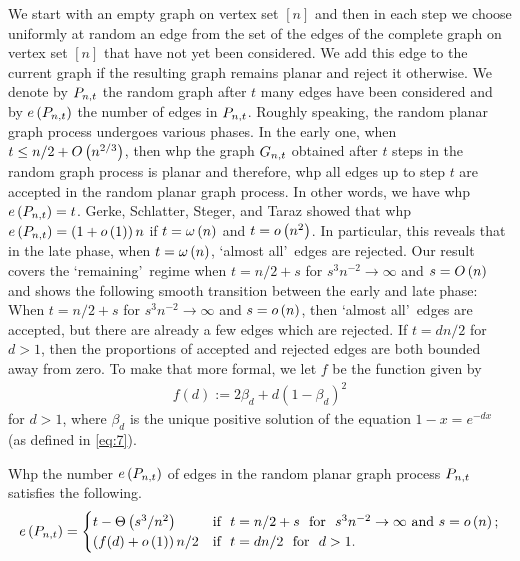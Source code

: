 We start with an empty graph on vertex set $[n]$ and then in each step we choose uniformly at random an edge from the set of the edges of the complete graph on vertex set $[n]$ that have not yet been considered. We add this edge to the current graph if the resulting graph remains planar and reject it otherwise. We denote by $P_{n,t}$ the random graph after $t$ many edges have been considered and by $e\left({P_{n,t}}\right)$ the number of edges in $P_{n,t}$. Roughly speaking, the random planar graph process undergoes various phases. In the early one, when $t\leq n/2+O\left(n^{2/3}\right)$, then whp the graph $G_{n,t}$ obtained after $t$ steps in the random graph process is planar and therefore, whp all edges up to step $t$ are accepted in the random planar graph process. In other words, we have whp $e\left({P_{n,t}}\right)=t$. Gerke, Schlatter, Steger, and Taraz \cite{GerkeSchlatterStegerTaraz2008} showed that whp $e\left({P_{n,t}}\right)=\left(1+o\left(1\right)\right)n$ if $t=\omega\left(n\right)$ and $t=o\left(n^2\right)$. In particular, this reveals that in the late phase, when $t=\omega\left(n\right)$, \lq almost all\rq\ edges are rejected. Our result covers the \lq remaining\rq\ regime when $t=n/2+s$ for $s^3n^{-2}\to\infty$ and $s=O\left(n\right)$ and shows the following smooth transition between the early and late phase: When $t=n/2+s$ for $s^3n^{-2}\to \infty$ and $s=o\left(n\right)$, then \lq almost all\rq\ edges are accepted, but there are already a few edges which are rejected. If $t=dn/2$ for $d>1$, then the proportions of accepted and rejected edges are both bounded away from zero. To make that more formal, we let $f$ be the function given by
\begin{align}\label{eq:2}
f(d):=2\beta_d+d\left(1-\beta_d\right)^2    
\end{align}
for $d>1$, where $\beta_d$ is the unique positive solution of the equation $1-x=e^{-dx}$ (as defined in \eqref{eq:7}).

\begin{thm}\label{thm:main_process_number_edges}
Whp the number $e\left({P_{n,t}}\right)$ of edges in the random planar graph process $P_{n,t}$ satisfies the following.
\begin{align*}
e\left({P_{n,t}}\right)=
\begin{cases}
t-\Theta\left(s^3/n^2\right)& \text{if} ~~ t=n/2+s ~~\text{for}~~ s^3n^{-2}\to \infty \text{ and }s=o\left(n\right);
\\
\left(f(d)+o\left(1\right)\right)n/2& \text{if} ~~ t=dn/2 ~~\text{for}~~ d>1.
\end{cases}
\end{align*}
\end{thm}

